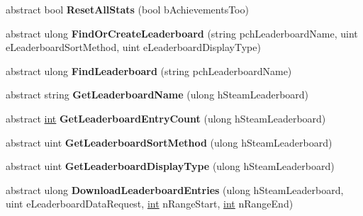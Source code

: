 \begin{DoxyCompactItemize}
\item 
\hypertarget{classValve_1_1Steamworks_1_1ISteamUserStats_a0d898305e8a2e083b9d5cdcac34f8fea}{}abstract bool {\bfseries Reset\+All\+Stats} (bool b\+Achievements\+Too)\label{classValve_1_1Steamworks_1_1ISteamUserStats_a0d898305e8a2e083b9d5cdcac34f8fea}

\item 
\hypertarget{classValve_1_1Steamworks_1_1ISteamUserStats_acbfac9617815a168abcec4753a3c4d32}{}abstract ulong {\bfseries Find\+Or\+Create\+Leaderboard} (string pch\+Leaderboard\+Name, uint e\+Leaderboard\+Sort\+Method, uint e\+Leaderboard\+Display\+Type)\label{classValve_1_1Steamworks_1_1ISteamUserStats_acbfac9617815a168abcec4753a3c4d32}

\item 
\hypertarget{classValve_1_1Steamworks_1_1ISteamUserStats_a79df9183ba3695814b8bfd76cacc4e39}{}abstract ulong {\bfseries Find\+Leaderboard} (string pch\+Leaderboard\+Name)\label{classValve_1_1Steamworks_1_1ISteamUserStats_a79df9183ba3695814b8bfd76cacc4e39}

\item 
\hypertarget{classValve_1_1Steamworks_1_1ISteamUserStats_a6ba5b1fc93a4595a4e29d625ee11b542}{}abstract string {\bfseries Get\+Leaderboard\+Name} (ulong h\+Steam\+Leaderboard)\label{classValve_1_1Steamworks_1_1ISteamUserStats_a6ba5b1fc93a4595a4e29d625ee11b542}

\item 
\hypertarget{classValve_1_1Steamworks_1_1ISteamUserStats_a04f61c569ec5cd0d92797156eef4ece8}{}abstract \hyperlink{SDL__thread_8h_a6a64f9be4433e4de6e2f2f548cf3c08e}{int} {\bfseries Get\+Leaderboard\+Entry\+Count} (ulong h\+Steam\+Leaderboard)\label{classValve_1_1Steamworks_1_1ISteamUserStats_a04f61c569ec5cd0d92797156eef4ece8}

\item 
\hypertarget{classValve_1_1Steamworks_1_1ISteamUserStats_a97650372ef3c5eedcc259a116020f748}{}abstract uint {\bfseries Get\+Leaderboard\+Sort\+Method} (ulong h\+Steam\+Leaderboard)\label{classValve_1_1Steamworks_1_1ISteamUserStats_a97650372ef3c5eedcc259a116020f748}

\item 
\hypertarget{classValve_1_1Steamworks_1_1ISteamUserStats_a097b01325f1f36c2ce3f1a53b39a978a}{}abstract uint {\bfseries Get\+Leaderboard\+Display\+Type} (ulong h\+Steam\+Leaderboard)\label{classValve_1_1Steamworks_1_1ISteamUserStats_a097b01325f1f36c2ce3f1a53b39a978a}

\item 
\hypertarget{classValve_1_1Steamworks_1_1ISteamUserStats_a266ba7aba2ffac0309c8e07690c11b6c}{}abstract ulong {\bfseries Download\+Leaderboard\+Entries} (ulong h\+Steam\+Leaderboard, uint e\+Leaderboard\+Data\+Request, \hyperlink{SDL__thread_8h_a6a64f9be4433e4de6e2f2f548cf3c08e}{int} n\+Range\+Start, \hyperlink{SDL__thread_8h_a6a64f9be4433e4de6e2f2f548cf3c08e}{int} n\+Range\+End)\label{classValve_1_1Steamworks_1_1ISteamUserStats_a266ba7aba2ffac0309c8e07690c11b6c}


\end{DoxyCompactItemize}
